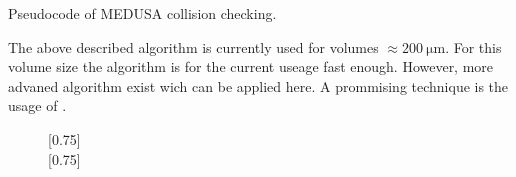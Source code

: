 %
\begin{lstfloat}[!t]
	
	\caption{Pseudocode of \acs{MEDUSA} collision checking.}
	\label{alg:medusa_collision}
\end{lstfloat}
%
The above described algorithm is currently used for volumes $\approx \SI{200}{\micro\meter}$.
For this volume size the algorithm is for the current useage fast enough.
However, more advaned algorithm exist wich can be applied here.
A prommising technique is the usage of  \cite{Karras2012}.
%
\begin{figure}[!t]
    \centering
    \subcaptionbox{\dummy{}}[0.75\textwidth]{\label{fig:medusa_8a}
    }
    \\[2em]
    \subcaptionbox{\dummy{}}[0.75\textwidth]{\label{fig:medusa_8b}
    }
	\caption{\cite{Ginsburger2019}}
	\label{fig:medusa_8}
\end{figure}
% 